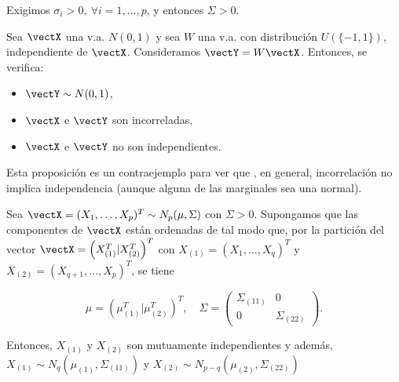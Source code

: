   \begin{nota}
Exigimos $\sigma_i > 0, \ \forall i = 1,\dots, p$, y entonces $\Sigma > 0$.
  \end{nota}

  \begin{nprop}
    Sea $\vectX$ una v.a. $N(0,1)$ y sea $W$ una v.a. con distribución $U(\{-1,1\})$, independiente de $\vectX$. Consideramos $\vectY = W\vectX$. Entonces, se verifica:
    \begin{itemize}
    \item $\vectY \sim N(0,1)$,
    \item $\vectX$ e $\vectY$ son incorreladas,
      \item $\vectX$ e $\vectY$ no son independientes. 
    \end{itemize}

  \end{nprop}
  Esta proposición es un contraejemplo para ver que , en general, incorrelación no implica independencia (aunque alguna de las marginales sea una normal).

  \begin{nth} \label{independenciacovbloques}
    Sea $\vectX = (X_1, \dots ,X_p)^T \sim N_p(\mu,\Sigma)$ con $\Sigma > 0$. Supongamos que las componentes de $\vectX$ están ordenadas de tal modo que, por la partición del vector $\vectX = \left(X_{(1)}^T | X_{(2)}^T\right)^T$ con $X_{(1)} = (X_1,\dots,X_q)^T$ y $X_{(2)} = (X_{q+1},\dots,X_p)^T$, se tiene
    
    \[
    \mu = \left(\mu_{(1)}^T | \mu_{(2)}^T\right)^T, \quad \Sigma = \begin{pmatrix} \Sigma_{(11)} & 0 \\ 0 & \Sigma_{(22)} \end{pmatrix}
    .\]
    
    Entonces, $X_{(1)}$ y $X_{(2)}$ son mutuamente independientes y además, $X_{(1)} \sim N_q(\mu_{(1)}, \Sigma_{(11)})$ y $X_{(2)} \sim N_{p-q}(\mu_{(2)}, \Sigma_{(22)})$
  \end{nth}

